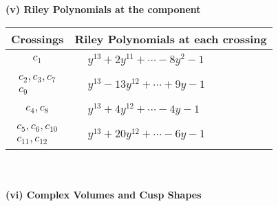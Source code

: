 \documentclass[1p]{elsarticle_modified}
\theoremstyle{definition}
\begin{document}
\newpage\renewcommand{\arraystretch}{1}
\flushleft \textbf{(v) Riley Polynomials at the component}\newline \\
\begin{tabular}{m{50pt}|m{274pt}}
Crossings & \hspace{64pt}Riley Polynomials at each crossing \\
\hline $$\begin{aligned}c_{1}\end{aligned}$$&$\begin{aligned}
&y^{13}+2 y^{11}+\cdots-8 y^2-1
\end{aligned}$\\
\hline $$\begin{aligned}c_{2},c_{3},c_{7}\\c_{9}\end{aligned}$$&$\begin{aligned}
&y^{13}-13 y^{12}+\cdots+9 y-1
\end{aligned}$\\
\hline $$\begin{aligned}c_{4},c_{8}\end{aligned}$$&$\begin{aligned}
&y^{13}+4 y^{12}+\cdots-4 y-1
\end{aligned}$\\
\hline $$\begin{aligned}c_{5},c_{6},c_{10}\\c_{11},c_{12}\end{aligned}$$&$\begin{aligned}
&y^{13}+20 y^{12}+\cdots-6 y-1
\end{aligned}$\\
\hline
\end{tabular}\\~\\
\newpage\flushleft \textbf{(vi) Complex Volumes and Cusp Shapes}
\end{document}
